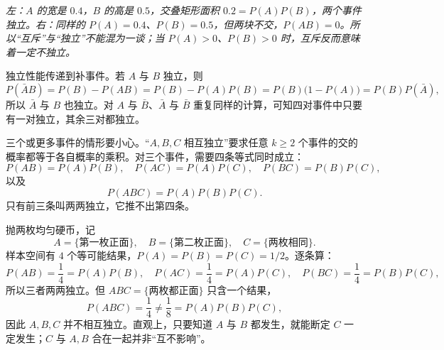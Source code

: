 \begin{center}
\par\vspace{2pt}
{\footnotesize\itshape 左：$A$ 的宽是 $0.4$，$B$ 的高是 $0.5$，交叠矩形面积 $0.2=P(A)P(B)$，两个事件独立。右：同样的 $P(A)=0.4$、$P(B)=0.5$，但两块不交，$P(AB)=0$。所以“互斥”与“独立”不能混为一谈；当 $P(A)>0$、$P(B)>0$ 时，互斥反而意味着一定不独立。}
\end{center}

独立性能传递到补事件。若 $A$ 与 $B$ 独立，则
\[
P(\bar A B)=P(B)-P(AB)=P(B)-P(A)P(B)=P(B)\bigl(1-P(A)\bigr)=P(B)P(\bar A),
\]
所以 $\bar A$ 与 $B$ 也独立。对 $A$ 与 $\bar B$、$\bar A$ 与 $\bar B$ 重复同样的计算，可知四对事件中只要有一对独立，其余三对都独立。

三个或更多事件的情形要小心。“$A,B,C$ 相互独立”要求任意 $k\ge2$ 个事件的交的概率都等于各自概率的乘积。对三个事件，需要四条等式同时成立：
\[
P(AB)=P(A)P(B),\quad P(AC)=P(A)P(C),\quad P(BC)=P(B)P(C),
\]
以及
\[
P(ABC)=P(A)P(B)P(C).
\]
只有前三条叫两两独立，它推不出第四条。

抛两枚均匀硬币，记
\[
A=\{\text{第一枚正面}\},\quad B=\{\text{第二枚正面}\},\quad C=\{\text{两枚相同}\}.
\]
样本空间有 $4$ 个等可能结果，$P(A)=P(B)=P(C)=1/2$。逐条算：
\[
P(AB)=\frac14=P(A)P(B),\quad
P(AC)=\frac14=P(A)P(C),\quad
P(BC)=\frac14=P(B)P(C),
\]
所以三者两两独立。但 $ABC=\{\text{两枚都正面}\}$ 只含一个结果，
\[
P(ABC)=\frac14\ne\frac18=P(A)P(B)P(C),
\]
因此 $A,B,C$ 并不相互独立。直观上，只要知道 $A$ 与 $B$ 都发生，就能断定 $C$ 一定发生；$C$ 与 $A,B$ 合在一起并非“互不影响”。

